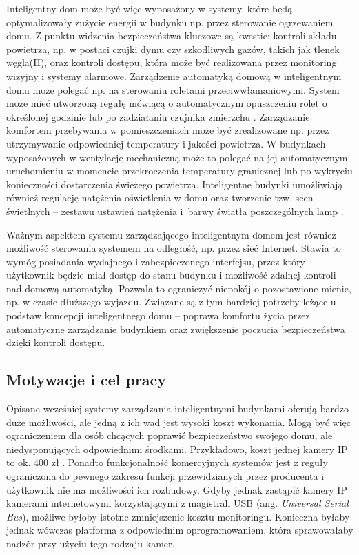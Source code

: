 \documentclass[a4paper,11pt,twoside]{article}
\begin{document}
Inteligentny dom może być więc wyposażony w systemy, które będą optymalizowały zużycie energii w budynku np. przez sterowanie ogrzewaniem domu. Z punktu widzenia bezpieczeństwa kluczowe są kwestie: kontroli składu powietrza, np. w postaci czujki dymu czy szkodliwych gazów, takich jak tlenek węgla(II), oraz kontroli dostępu, która może być realizowana przez monitoring wizyjny i systemy alarmowe. Zarządzenie automatyką domową w inteligentnym domu może polegać np. na sterowaniu roletami przeciwwłamaniowymi. System może mieć utworzoną regułę mówiącą o automatycznym opuszczeniu rolet o określonej godzinie lub po zadziałaniu czujnika zmierzchu \cite{inteligentny_dom}. Zarządzanie komfortem przebywania w pomieszczeniach może być zrealizowane np. przez utrzymywanie odpowiedniej temperatury i jakości powietrza. W budynkach wyposażonych w wentylację mechaniczną może to polegać na jej automatycznym uruchomieniu w momencie przekroczenia temperatury granicznej lub po wykryciu konieczności dostarczenia świeżego powietrza. Inteligentne budynki umożliwiają również regulację natężenia oświetlenia w domu oraz tworzenie tzw. scen świetlnych -- zestawu ustawień natężenia i~barwy światła poszczególnych lamp \cite{inteligentny_dom}.

Ważnym aspektem systemu zarządzającego inteligentnym domem jest również możliwość sterowania systemem na odległość, np. przez sieć Internet. Stawia to wymóg posiadania wydajnego i zabezpieczonego interfejsu, przez który użytkownik będzie miał dostęp do stanu budynku i możliwość zdalnej kontroli nad domową automatyką. Pozwala to ograniczyć niepokój o pozostawione mienie, np. w czasie dłuższego wyjazdu. Związane są z tym bardziej potrzeby leżące u podstaw koncepcji inteligentnego domu -- poprawa komfortu życia przez automatyczne zarządzanie budynkiem oraz zwiększenie poczucia bezpieczeństwa dzięki kontroli dostępu. 

\subsection{Motywacje i cel pracy}
Opisane wcześniej systemy zarządzania inteligentnymi budynkami oferują bardzo duże możliwości, ale jedną z ich wad jest wysoki koszt wykonania. Mogą być więc ograniczeniem dla osób chcących poprawić bezpieczeństwo swojego domu, ale niedysponujących odpowiednimi środkami. Przykładowo, koszt jednej kamery IP to ok. 400 zł \cite{komputer_świat}. Ponadto funkcjonalność komercyjnych systemów jest z reguły ograniczona do pewnego zakresu funkcji przewidzianych przez producenta i użytkownik nie ma możliwości ich rozbudowy. Gdyby jednak zastąpić kamery IP kamerami internetowymi korzystającymi z magistrali USB (ang. \textit{Universal Serial Bus}), możliwe byłoby istotne zmniejszenie kosztu monitoringu. Konieczna byłaby jednak wówczas platforma z odpowiednim oprogramowaniem, która sprawowałaby nadzór przy użyciu tego rodzaju kamer. 
\end{document}
